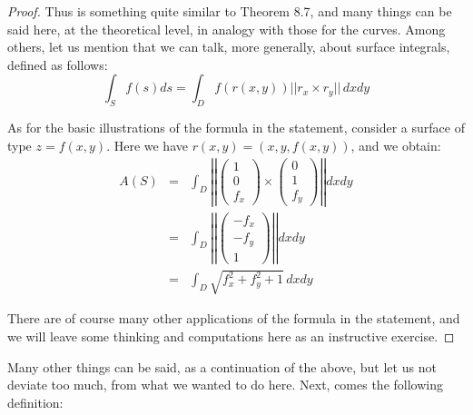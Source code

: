 \documentclass[12pt]{amsbook}
\begin{document}
\begin{proof}
Thus is something quite similar to Theorem 8.7, and many things can be said here, at the theoretical level, in analogy with those for the curves. Among others, let us mention that we can talk, more generally, about surface integrals, defined as follows:
$$\int_Sf(s)ds=\int_Df(r(x,y))||r_x\times r_y||\,dxdy$$

As for the basic illustrations of the formula in the statement, consider a surface of type $z=f(x,y)$. Here we have $r(x,y)=(x,y,f(x,y))$, and we obtain:
\begin{eqnarray*}
A(S)
&=&\int_D\left|\left|\begin{pmatrix}1\\0\\f_x\end{pmatrix}\times\begin{pmatrix}0\\1\\f_y\end{pmatrix}\right|\right|dxdy\\
&=&\int_D\left|\left|\begin{pmatrix}-f_x\\-f_y\\1\end{pmatrix}\right|\right|dxdy\\
&=&\int_D\sqrt{f_x^2+f_y^2+1}\,dxdy
\end{eqnarray*}

There are of course many other applications of the formula in the statement, and we will leave some thinking and computations here as an instructive exercise.
\end{proof}

Many other things can be said, as a continuation of the above, but let us not deviate too much, from what we wanted to do here. Next, comes the following definition:
\end{document}

